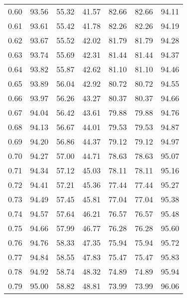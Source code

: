 \begin{tabular}{|c|c|c|c|c|c|c|}
      0.60 &     93.56 &     55.32 &      41.57 &   82.66 &      82.66 &         94.11 \\
      0.61 &     93.61 &     55.42 &      41.78 &   82.26 &      82.26 &         94.19 \\
      0.62 &     93.67 &     55.52 &      42.02 &   81.79 &      81.79 &         94.28 \\
      0.63 &     93.74 &     55.69 &      42.31 &   81.44 &      81.44 &         94.37 \\
      0.64 &     93.82 &     55.87 &      42.62 &   81.10 &      81.10 &         94.46 \\
      0.65 &     93.89 &     56.04 &      42.92 &   80.72 &      80.72 &         94.55 \\
      0.66 &     93.97 &     56.26 &      43.27 &   80.37 &      80.37 &         94.66 \\
      0.67 &     94.04 &     56.42 &      43.61 &   79.88 &      79.88 &         94.76 \\
      0.68 &     94.13 &     56.67 &      44.01 &   79.53 &      79.53 &         94.87 \\
      0.69 &     94.20 &     56.86 &      44.37 &   79.12 &      79.12 &         94.97 \\
      0.70 &     94.27 &     57.00 &      44.71 &   78.63 &      78.63 &         95.07 \\
      0.71 &     94.34 &     57.12 &      45.03 &   78.11 &      78.11 &         95.16 \\
      0.72 &     94.41 &     57.21 &      45.36 &   77.44 &      77.44 &         95.27 \\
      0.73 &     94.49 &     57.45 &      45.81 &   77.04 &      77.04 &         95.38 \\
      0.74 &     94.57 &     57.64 &      46.21 &   76.57 &      76.57 &         95.48 \\
      0.75 &     94.66 &     57.99 &      46.77 &   76.28 &      76.28 &         95.60 \\
      0.76 &     94.76 &     58.33 &      47.35 &   75.94 &      75.94 &         95.72 \\
      0.77 &     94.84 &     58.55 &      47.83 &   75.47 &      75.47 &         95.83 \\
      0.78 &     94.92 &     58.74 &      48.32 &   74.89 &      74.89 &         95.94 \\
      0.79 &     95.00 &     58.82 &      48.81 &   73.99 &      73.99 &         96.06 \\

\end{tabular}
